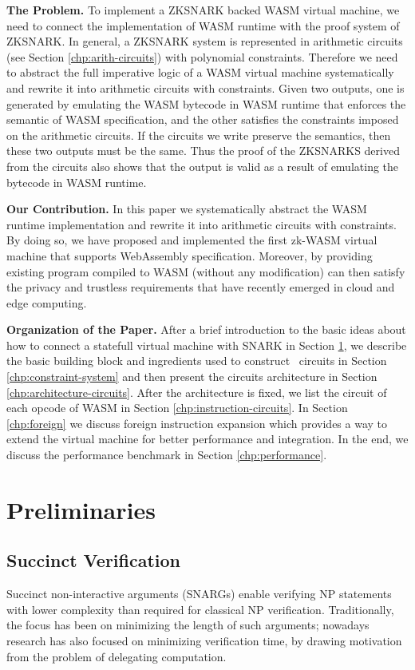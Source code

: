 \smallskip\noindent\textbf{The Problem.}
To implement a ZKSNARK backed WASM virtual machine, we need to connect the implementation of WASM runtime with the proof system of ZKSNARK. In general, a ZKSNARK system is represented in arithmetic circuits (see Section \ref{chp:arith-circuits}) with polynomial constraints. Therefore we need to abstract the full imperative logic of a WASM virtual machine systematically and rewrite it into arithmetic circuits with constraints. Given two outputs, one is generated by emulating the WASM bytecode in WASM runtime that enforces the semantic of WASM specification, and the other satisfies the constraints imposed on the arithmetic circuits. If the circuits we write preserve the semantics, then these two outputs must be the same. Thus the proof of the ZKSNARKS derived from the circuits also shows that the output is valid as a result of emulating the bytecode in WASM runtime. 

\smallskip\noindent\textbf{Our Contribution.}
In this paper we systematically abstract the WASM runtime implementation and rewrite it into arithmetic circuits with constraints. By doing so, we have proposed and implemented the first zk-WASM virtual machine that supports WebAssembly specification. Moreover, by providing \zkwasm\, existing program compiled to WASM (without any modification) can then satisfy the privacy and trustless requirements that have recently emerged in cloud and edge computing.

\smallskip\noindent\textbf{Organization of the Paper.}
After a brief introduction to the basic ideas about how to connect a statefull virtual machine with SNARK in Section \ref{chp:preliminary}, we describe the basic building block and ingredients used to construct \zkwasm\, circuits in Section \ref{chp:constraint-system} and then present the circuits architecture in Section \ref{chp:architecture-circuits}. After the architecture is fixed, we list the circuit of each opcode of WASM in Section \ref{chp:instruction-circuits}. In Section \ref{chp:foreign} we discuss foreign instruction expansion which provides a way to extend the virtual machine for better performance and integration. In the end, we discuss the performance benchmark in Section \ref{chp:performance}.

\section{Preliminaries}
\label{chp:preliminary}
\subsection{Succinct Verification}
Succinct non-interactive arguments (SNARGs) enable verifying NP statements with lower complexity than required for classical NP verification. Traditionally, the focus has been on minimizing the length of such arguments; nowadays research has also focused on minimizing verification time, by drawing motivation from the problem of delegating computation.

